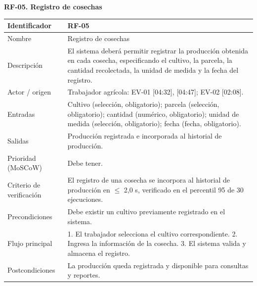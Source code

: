 \documentclass[12pt,a4paper]{article}
\begin{document}
\begin{minipage}{\linewidth}
\bigskip
\noindent\textbf{RF-05. Registro de cosechas}
\label{tab:RF-05}

\begin{center}
\begin{tabular}{|p{3.5cm}|p{10.7cm}|}
\hline
Identificador & RF-05 \\
\hline
Nombre & Registro de cosechas \\
\hline
Descripción & El sistema deberá permitir registrar la producción obtenida en cada cosecha, especificando el cultivo, la parcela, la cantidad recolectada, la unidad de medida y la fecha del registro. \\
\hline
Actor / origen & Trabajador agrícola: EV-01 [04:32], [04:47]; EV-02 [02:08]. \\
\hline
Entradas & Cultivo (selección, obligatorio); parcela (selección, obligatorio); cantidad (numérico, obligatorio); unidad de medida (selección, obligatorio); fecha (fecha, obligatorio). \\
\hline
Salidas & Producción registrada e incorporada al historial de producción. \\
\hline
Prioridad (MoSCoW) & Debe tener. \\
\hline
Criterio de verificación & El registro de una cosecha se incorpora al historial de producción en $\leq$ 2,0 s, verificado en el percentil 95 de 30 ejecuciones. \\
\hline
Precondiciones & Debe existir un cultivo previamente registrado en el sistema. \\
\hline
Flujo principal & 1. El trabajador selecciona el cultivo correspondiente. 2. Ingresa la información de la cosecha. 3. El sistema valida y almacena el registro. \\
\hline
Postcondiciones & La producción queda registrada y disponible para consultas y reportes. \\
\hline
\end{tabular}
\end{center}
\end{minipage}
\end{document}
